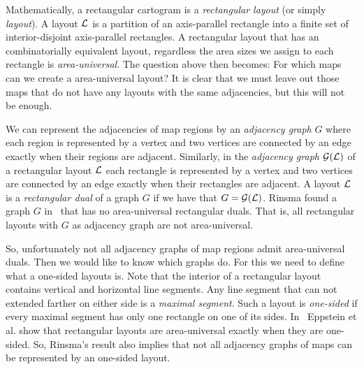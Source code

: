 %

  Mathematically, a rectangular cartogram is a  \emph{rectangular layout} (or simply \emph{layout}).
  A layout $\mathcal{L}$ is a partition of an axis-parallel rectangle into a finite set of interior-disjoint axis-parallel rectangles.
  A rectangular layout that has an combinatorially equivalent layout, regardless the area sizes we assign to each rectangle is \emph{area-universal}.
  The question above then becomes: For which maps can we create a area-universal layout?
  It is clear that we must leave out those maps that do not have any layouts with the same adjacencies, but this will not be enough.

  We can represent the adjacencies of map regions by an \emph{adjacency graph} $G$ where each region is represented by a vertex and two vertices are connected by an edge exactly when their regions are adjacent.
  Similarly, in the \emph{adjacency graph} $\mathcal{G}(\mathcal{L})$ of a rectangular layout $\mathcal{L}$ each rectangle is represented by a vertex and two vertices are connected by an edge exactly when their rectangles are adjacent.
  A layout $\mathcal{L}$ is a \emph{rectangular dual} of a graph $G$ if we have that $G = \mathcal{G}(\mathcal{L})$.
  Rinsma found a graph $G$ in~\cite{Rinsma1987} that has no area-universal rectangular duals.
  That is, all rectangular layouts with $G$ as adjacency graph are not area-universal.

  So, unfortunately not all adjacency graphs of map regions admit area-universal duals.
  Then we would like to know which graphs do.
  For this we need to define what a one-sided layouts is.
  Note that the interior of a rectangular layout contains vertical and horizontal line segments.
  Any line segment that can not extended farther on either side is a \emph{maximal segment}.
  Such a layout is \emph{one-sided} if every maximal segment has only one rectangle on one of its sides.
  In~\cite{Eppstein2012} Eppstein et al. show that rectangular layouts are area-universal exactly when they are one-sided.
  So, Rinsma's result also implies that not all adjacency graphs of maps can be represented by an one-sided layout.


